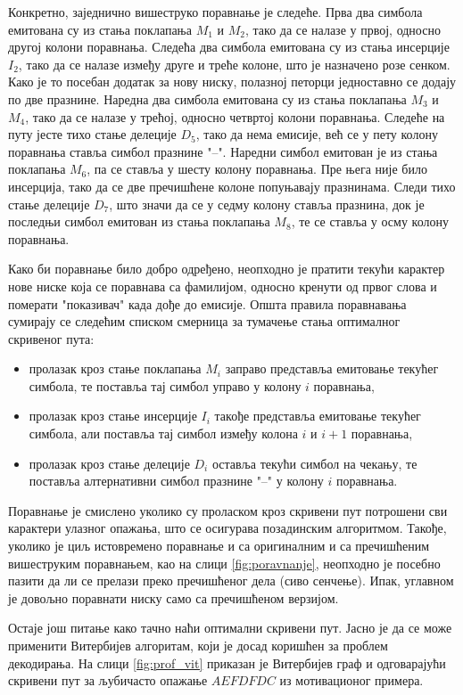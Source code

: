 \documentclass[12pt,oneside]{memoir}
\begin{document}
\begin{CJK}{UTF8}{ipxm}
Конкретно, заједнично вишеструко поравнање је следеће. Прва два симбола емитована су из стања поклапања $M_1$ и $M_2$, тако да се налазе у првој, односно другој колони поравнања. Следећа два симбола емитована су из стања инсерције $I_2$, тако да се налазе између друге и треће колоне, што је назначено розе сенком. Како је то посебан додатак за нову ниску, полазној петорци једноставно се додају по две празнине. Наредна два симбола емитована су из стања поклапања $M_3$ и $M_4$, тако да се налазе у трећој, односно четвртој колони поравнања. Следеће на путу јесте тихо стање делеције $D_5$, тако да нема емисије, већ се у пету колону поравнања ставља симбол празнине "--". Наредни симбол емитован је из стања поклапања $M_6$, па се ставља у шесту колону поравнања. Пре њега није било инсерција, тако да се две пречишћене колоне попуњавају празнинама. Следи тихо стање делеције $D_7$, што значи да се у седму колону ставља празнина, док је последњи симбол емитован из стања поклапања $M_8$, те се ставља у осму колону поравнања.

Како би поравнање било добро одређено, неопходно је пратити текући карактер нове ниске која се поравнава са фамилијом, односно кренути од првог слова и померати "показивач" када дође до емисије. Општа правила поравнавања сумирају се следећим списком смерница за тумачење стања оптималног скривеног пута:
\begin{itemize}
  \item пролазак кроз стање поклапања $M_i$ заправо представља емитовање текућег симбола, те поставља тај симбол управо у колону $i$ поравнања,
  \item пролазак кроз стање инсерције $I_i$ такође представља емитовање текућег симбола, али поставља тај симбол између колона $i$ и $i+1$ поравнања,
  \item пролазак кроз стање делеције $D_i$ оставља текући симбол на чекању, те поставља алтернативни симбол празнине "--" у колону $i$ поравнања.
\end{itemize}
Поравнање је смислено уколико су проласком кроз скривени пут потрошени сви карактери улазног опажања, што се осигурава позадинским алгоритмом. Такође, уколико је циљ истовремено поравнање и са оригиналним и са пречишћеним вишеструким поравнањем, као на слици \ref{fig:poravnanje}, неопходно је посебно пазити да ли се прелази преко пречишћеног дела (сиво сенчење). Ипак, углавном је довољно поравнати ниску само са пречишћеном верзијом.

Остаје још питање како тачно наћи оптимални скривени пут. Јасно је да се може применити Витербијев алгоритам, који је досад коришћен за проблем декодирања. На слици \ref{fig:prof_vit} приказан је Витербијев граф и одговарајући скривени пут за љубичасто опажање $AEFDFDC$ из мотивационог примера.


\end{CJK}
\end{document}
